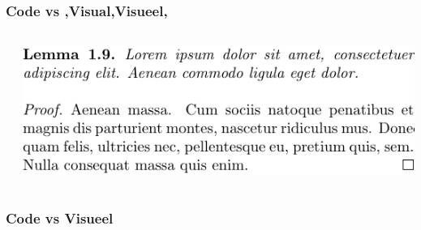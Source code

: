 \documentclass[../presentatie.tex]{subfiles}
\def\named#1{}
\begin{document}
    \begin{frame}
        \frametitle{Code vs \lang,Visual,Visueel,}
        \begin{columns}
            \begin{column}{0.5\textwidth}
            \end{column}
            \begin{column}{0.5\textwidth}
                \includegraphics[width=\linewidth,height=0.8\textheight,keepaspectratio]{assets/1_Inleiding/latexRepeatEl.pdf}
            \end{column}
        \end{columns}
    \end{frame}

    \let\frameselection\somethingundefined
    
    \named{intro-visueelcomp-wordugly}
    
    \ifx\frameselection\somethingundefined
        \def\frameselection{1-}
    \fi
    
    \def\pasteframeselection#1{\begin{frame}<#1>}%
    \expandafter\pasteframeselection\expandafter{\frameselection}%
        \frametitle{Code vs Visueel}
    
\end{document}
